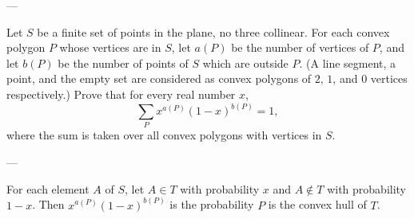 
---

Let $S$ be a finite set of points in the plane, no three collinear. For each convex polygon $P$ whose vertices are in $S$, let $a(P)$ be the number of vertices of $P$, and let $b(P)$ be the number of points of $S$ which are outside $P$. (A line segment, a point, and the empty set are considered as convex polygons of $2$, $1$, and $0$ vertices respectively.) Prove that for every real number $x$, \[\sum_P{x^{a(P)}(1-x)^{b(P)}}=1,\]
where the sum is taken over all convex polygons with vertices in $S$.

---

For each element $A$ of $S$, let $A\in T$ with probability $x$ and $A\notin T$ with probability $1-x$. Then $x^{a(P)}(1-x)^{b(P)}$ is the probability $P$ is the convex hull of $T$.

